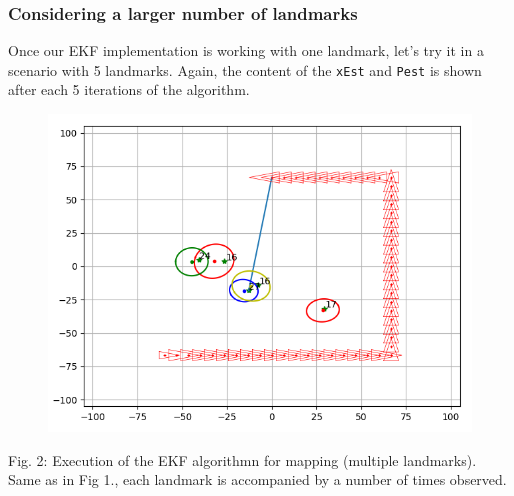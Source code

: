 \documentclass[11pt]{article}
\begin{document}
    \hypertarget{considering-a-larger-number-of-landmarks}{%
\subsubsection{Considering a larger number of
landmarks}\label{considering-a-larger-number-of-landmarks}}

Once our EKF implementation is working with one landmark, let's try it
in a scenario with 5 landmarks. Again, the content of the \texttt{xEst}
and \texttt{Pest} is shown after each 5 iterations of the algorithm.

\begin{figure}
\centering
\includegraphics{fig6-1-3.png}
\end{figure}

Fig. 2: Execution of the EKF algorithmn for mapping (multiple
landmarks). Same as in Fig 1., each landmark is accompanied by a number
of times observed.
\end{document}
